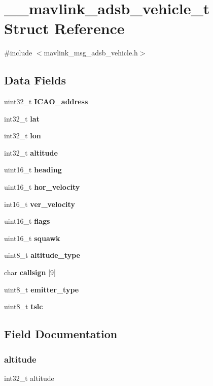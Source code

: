 \section{\+\_\+\+\_\+mavlink\+\_\+adsb\+\_\+vehicle\+\_\+t Struct Reference}
\label{struct____mavlink__adsb__vehicle__t}


{\ttfamily \#include $<$mavlink\+\_\+msg\+\_\+adsb\+\_\+vehicle.\+h$>$}

\subsection*{Data Fields}
\begin{DoxyCompactItemize}
\item 
uint32\+\_\+t \textbf{ I\+C\+A\+O\+\_\+address}
\item 
int32\+\_\+t \textbf{ lat}
\item 
int32\+\_\+t \textbf{ lon}
\item 
int32\+\_\+t \textbf{ altitude}
\item 
uint16\+\_\+t \textbf{ heading}
\item 
uint16\+\_\+t \textbf{ hor\+\_\+velocity}
\item 
int16\+\_\+t \textbf{ ver\+\_\+velocity}
\item 
uint16\+\_\+t \textbf{ flags}
\item 
uint16\+\_\+t \textbf{ squawk}
\item 
uint8\+\_\+t \textbf{ altitude\+\_\+type}
\item 
char \textbf{ callsign} [9]
\item 
uint8\+\_\+t \textbf{ emitter\+\_\+type}
\item 
uint8\+\_\+t \textbf{ tslc}
\end{DoxyCompactItemize}


\subsection{Field Documentation}
\mbox{\label{struct____mavlink__adsb__vehicle__t_a5402881d7f8a92e6838995507bf2e7f9}} 
\subsubsection{altitude}
{\footnotesize\ttfamily int32\+\_\+t altitude}

